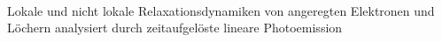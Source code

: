 \documentclass[a4paper,12pt,twoside]{article}
\begin{document}
\\


\renewcommand{\baselinestretch}{1.0}\normalsize
\newpage
\LARGE
Lokale und nicht lokale Relaxationsdynamiken von angeregten Elektronen und Löchern analysiert durch zeitaufgelöste lineare Photoemission
\end{document}
